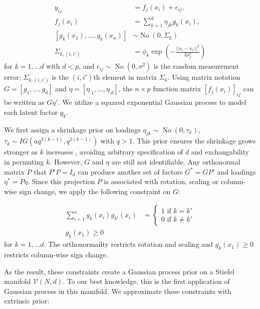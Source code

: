 \documentclass[10pt]{article}
\newcommand{\mc}[1]{\mathcal{#1}}
\DeclareMathOperator{\No}{No}
\DeclareMathOperator{\1}{\mathbbm{1}}
\begin{document}
\begin{equation*}
\begin{aligned}
y_{ij} & = f_j(x_i) + \epsilon_{ij},\\
 f_j(x_i) & = \sum_{k=1}^{d} \eta_{jk} g_k(x_i),\\
 \left [ g_k(x_1) , \ldots , g_k(x_n) \right] &\sim \No (0, \Sigma_k)\\
\Sigma_{k,(i,i')} &= \phi_k\exp( - \frac{||x_i-x_{i'}||^2}{2\rho_k^2})
\end{aligned}
\end{equation*}
for $k=1,\ldots d$ with $d<p$, and $\epsilon_{ij}\sim \No(0,\sigma^2)$ is the random measurement error; $\Sigma_{k,(i,i')}$ is the $(i,i')$th element in matrix $\Sigma_k$. Using matrix notation $G=[g_1, \ldots, g_d]$ and $\eta= [\eta_{.1},\ldots,\eta_{.d}]$, the $n\times p$ function matrix $[f_j(x_i)]_{ij}$ can be written as $G \eta'$. We utilize a squared exponential Gaussian process to model each latent factor $g_k$.

We first assign a shrinkage prior on loadings $\eta_{jk}\sim \No(0,\tau_k)$, $\tau_k \sim IG(aq^{3(k-1)},q^{2(k-1)})$  with $q>1$. This prior ensures the shrinkage grows stronger as $k$ increases \citep{bhattacharya2011sparse}, avoiding arbitrary specification of $d$ and exchangability in permuting $k$. However, $G$ and $\eta$ are still not identifiable. Any orthonormal matrix $P$ that $P'P = I_d$ can produce another set of factors $G^*= GP'$ and loadings $\eta^* = P\eta$. Since this projection $P$ is associated with rotation, scaling or column-wise sign change, we apply the following constraint on $G$:

\begin{equation*}
\begin{aligned}
 \sum_{i=1}^n g_k(x_i) g_{k'}(x_i) &= \left\{ \begin{array}{cc}1 \text{ if } k=k' \\ 0 \text{ if } k \neq k'\end{array}\right. \\
 g_k(x_1) \ge 0
\end{aligned}
\end{equation*}
for $k=1,\ldots d$. The orthonormailty restricts rotation and scaling and $g_k(x_1)\ge 0$ restricts column-wise sign change. 

As the result, these constraints create a Gaussian process prior on a Stiefel manifold $\mc V(N,d)$. To our best knowledge, this is the first application of Gaussian process in this manifold. We approximate these constraints with extrinsic prior:
\end{document}
